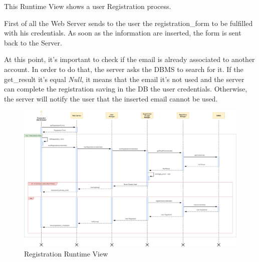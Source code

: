 This Runtime View shows a user Registration process.\par
First of all the Web Server sends to the user the registration\_form to be fulfilled with his credentials. As soon as the information are inserted, the form is sent back to the Server.\par
At this point, it’s important to check if the email is already associated to another account. In order to do that, the server asks the DBMS to search for it. If the get\_result it’s equal \emph{Null}, it means that the email it’s not used and the server can complete the registration saving in the DB the user credentials. Otherwise, the server will notify the user that the inserted email cannot be used.
\begin{figure}[H]
	\centering
	\includegraphics[scale=0.2]{Images/Runtime/Registration}
	\caption{Registration Runtime View}
\end{figure}

